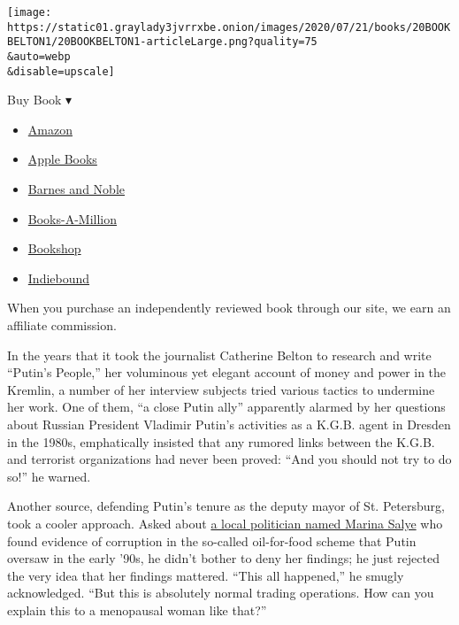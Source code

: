\texttt{[image: https://static01.graylady3jvrrxbe.onion/images/2020/07/21/books/20BOOKBELTON1/20BOOKBELTON1-articleLarge.png?quality=75\\\&auto=webp\\\&disable=upscale]}

Buy Book ▾

\begin{itemize}
\tightlist
\item
  \href{https://www.amazon.com/gp/search?index=books\&tag=NYTBSREV-20\&field-keywords=Putin\%E2\%80\%99s+People+Catherine+Belton}{Amazon}
\item
  \href{https://du-gae-books-dot-nyt-du-prd.appspot.com/buy?title=Putin\%E2\%80\%99s+People\&author=Catherine+Belton}{Apple
  Books}
\item
  \href{https://www.anrdoezrs.net/click-7990613-11819508?url=https\%3A\%2F\%2Fwww.barnesandnoble.com\%2Fw\%2F\%3Fean\%3D9780374238711}{Barnes
  and Noble}
\item
  \href{https://www.anrdoezrs.net/click-7990613-35140?url=https\%3A\%2F\%2Fwww.booksamillion.com\%2Fp\%2FPutin\%25E2\%2580\%2599s\%2BPeople\%2FCatherine\%2BBelton\%2F9780374238711}{Books-A-Million}
\item
  \href{https://bookshop.org/a/3546/9780374238711}{Bookshop}
\item
  \href{https://www.indiebound.org/book/9780374238711?aff=NYT}{Indiebound}
\end{itemize}

When you purchase an independently reviewed book through our site, we
earn an affiliate commission.

In the years that it took the journalist Catherine Belton to research
and write ``Putin's People,'' her voluminous yet elegant account of
money and power in the Kremlin, a number of her interview subjects tried
various tactics to undermine her work. One of them, ``a close Putin
ally'' apparently alarmed by her questions about Russian President
Vladimir Putin's activities as a K.G.B. agent in Dresden in the 1980s,
emphatically insisted that any rumored links between the K.G.B. and
terrorist organizations had never been proved: ``And you should not try
to do so!'' he warned.

Another source, defending Putin's tenure as the deputy mayor of St.
Petersburg, took a cooler approach. Asked about
\href{https://www.nytimes3xbfgragh.onion/2012/03/24/world/europe/marina-salye-a-russian-politician-who-tried-to-prosecute-putin-dies-at-77.html}{a
local politician named Marina Salye} who found evidence of corruption in
the so-called oil-for-food scheme that Putin oversaw in the early '90s,
he didn't bother to deny her findings; he just rejected the very idea
that her findings mattered. ``This all happened,'' he smugly
acknowledged. ``But this is absolutely normal trading operations. How
can you explain this to a menopausal woman like that?''

